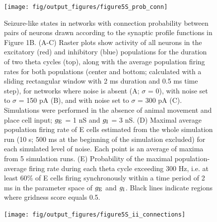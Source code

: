\documentclass[a4paper,12pt]{article}
\newcommand{\ssc}[3]{\ensuremath{#1_{\text{#2}_{\text{#3}}}}}
\newcommand{\gE      }{\ssc{g}      {\scriptsize{E}}{}}
\newcommand{\gI      }{\ssc{g}      {\scriptsize{I}}{}}
\begin{document}
\clearpage

\begin{figure}[p]
    \internallinenumbers
    \centering
        \texttt{[image: fig/output\_figures/figure5S\_prob\_conn]}
\end{figure}

\clearpage

\begin{figure}[H]
    \internallinenumbers
    \caption{Seizure-like states in networks with connection probability
    between pairs of neurons drawn according to the synaptic profile functions
    in Figure 1B. (A-C) Raster plots show activity of all neurons in the
    excitatory (red) and inhibitory (blue) populations for the duration of two
    theta cycles (top), along with the average population firing rates for both
    populations (center and bottom; calculated with a sliding rectangular
    window with 2 ms duration and 0.5 ms time step), for networks where noise
    is absent (A; $\sigma$ = 0), with noise set to $\sigma$ = 150 pA (B), and
    with noise set to $\sigma$ = 300 pA (C). Simulations were performed in the
    absence of animal movement and place cell input; $\gE$ = 1 nS and $\gI$ = 3 nS.
    (D) Maximal average population firing rate of E cells estimated from the
    whole simulation run (10 s; 500 ms at the beginning of the simulation
    excluded) for each simulated level of noise. Each point is an average of
    maxima from 5 simulation runs.  (E) Probability of the maximal
    population-average firing rate during each theta cycle exceeding 300 Hz,
    i.e. at least 60\% of E cells firing synchronously within a time period of
    2 ms in the parameter space of $\gE$ and $\gI$. Black lines indicate regions
    where gridness score equals 0.5.}
\end{figure}

\clearpage

\begin{figure}[p]
    \internallinenumbers
    \centering
        \texttt{[image: fig/output\_figures/figure5S\_ii\_connections]}
\end{figure}

\clearpage
\end{document}
